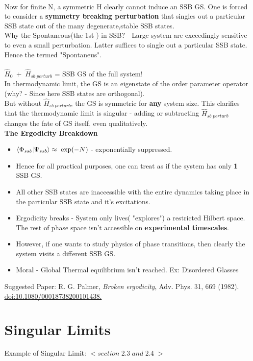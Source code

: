 \documentclass[12pt]{article}
\begin{document}
\\
Now for finite N, a symmetric H clearly cannot induce an SSB GS. One is forced to consider a \textbf{symmetry breaking perturbation} that singles out a particular SSB state out of the many degenerate,stable SSB states.\\
Why the Spontaneous(the 1st ) in SSB? - Large system are exceedingly sensitive to even a small perturbation. Latter  suffices to single out a particular SSB state. Hence the termed "Spontaneus".\\
\\
$\hat{H}_0\;+\;\hat{H}_{sb\;perturb}$ = SSB GS of the full system!\\
In thermodynamic limit, the GS is an eigenstate of the order parameter operator (why? - Since here SSB states are orthogonal).\\
But without $\hat{H}_{sb\;perturb}$, the GS is symmetric for \textbf{any} system size. This clarifies that the thermodynamic limit is singular - adding or subtracting $\hat{H}_{sb\;perturb}$ changes the fate of GS itself, even qualitatively.\\
\newline
\textbf{The Ergodicity Breakdown}
\begin{itemize}
    \item $\braket{\Phi_{ssb}}{\Psi_{ssb}}\approx\;\exp(-N)$ - exponentially suppressed.
    \item Hence for all practical purposes, one can treat as if the system has only \textbf{1} SSB GS.
    \item All other SSB states are inaccessible with the entire dynamics taking place in the particular SSB state and it's excitations.
    \item Ergodicity breaks - System only lives( "explores") a restricted Hilbert space. The rest of phase space isn't accessible on \textbf{experimental timescales}.
    \item However, if one wants to study physics of phase transitions, then clearly the system visits a different SSB GS.
    \item Moral - Global Thermal equilibrium isn't reached. Ex: Disordered Glasses
\end{itemize}
Suggested Paper: R. G. Palmer,\textit{ Broken ergodicity}, Adv. Phys. 31, 669 (1982).\\
\href{https://www.tandfonline.com/doi/abs/10.1080/00018738200101438}{doi:10.1080/00018738200101438.}

\section{Singular Limits}
Example of Singular Limit:
$<section\; 2.3 \;and\; 2.4\;>$
\end{document}
